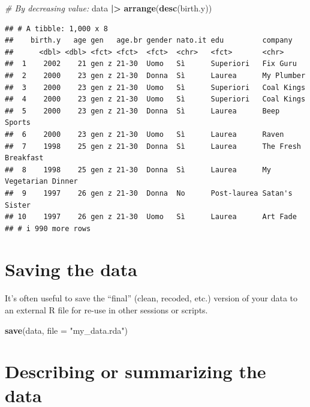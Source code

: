 \documentclass[
]{book}
\newenvironment{Shaded}{\begin{snugshade}}{\end{snugshade}}
\newcommand{\AttributeTok}[1]{\textcolor[rgb]{0.13,0.29,0.53}{#1}}
\newcommand{\CommentTok}[1]{\textcolor[rgb]{0.56,0.35,0.01}{\textit{#1}}}
\newcommand{\FunctionTok}[1]{\textcolor[rgb]{0.13,0.29,0.53}{\textbf{#1}}}
\newcommand{\NormalTok}[1]{#1}
\newcommand{\SpecialCharTok}[1]{\textcolor[rgb]{0.81,0.36,0.00}{\textbf{#1}}}
\newcommand{\StringTok}[1]{\textcolor[rgb]{0.31,0.60,0.02}{#1}}
\begin{document}
\begin{Shaded}
\begin{Highlighting}[]
\CommentTok{\# By decreasing value:}
\NormalTok{data }\SpecialCharTok{|\textgreater{}} 
  \FunctionTok{arrange}\NormalTok{(}\FunctionTok{desc}\NormalTok{(birth.y))}
\end{Highlighting}
\end{Shaded}

\begin{verbatim}
## # A tibble: 1,000 x 8
##    birth.y   age gen   age.br gender nato.it edu         company             
##      <dbl> <dbl> <fct> <fct>  <fct>  <chr>   <fct>       <chr>               
##  1    2002    21 gen z 21-30  Uomo   Sì      Superiori   Fix Guru            
##  2    2000    23 gen z 21-30  Donna  Sì      Laurea      My Plumber          
##  3    2000    23 gen z 21-30  Uomo   Sì      Superiori   Coal Kings          
##  4    2000    23 gen z 21-30  Uomo   Sì      Superiori   Coal Kings          
##  5    2000    23 gen z 21-30  Donna  Sì      Laurea      Beep Sports         
##  6    2000    23 gen z 21-30  Uomo   Sì      Laurea      Raven               
##  7    1998    25 gen z 21-30  Donna  Sì      Laurea      The Fresh Breakfast 
##  8    1998    25 gen z 21-30  Donna  Sì      Laurea      My Vegetarian Dinner
##  9    1997    26 gen z 21-30  Donna  No      Post-laurea Satan's Sister      
## 10    1997    26 gen z 21-30  Uomo   Sì      Laurea      Art Fade            
## # i 990 more rows
\end{verbatim}

\hypertarget{saving-the-data}{%
\section{Saving the data}\label{saving-the-data}}

It's often useful to save the ``final'' (clean, recoded, etc.) version of your data to an external R file for re-use in other sessions or scripts.

\begin{Shaded}
\begin{Highlighting}[]
\FunctionTok{save}\NormalTok{(data, }\AttributeTok{file =} \StringTok{"my\_data.rda"}\NormalTok{)}
\end{Highlighting}
\end{Shaded}

\hypertarget{describing-or-summarizing-the-data}{%
\section{Describing or summarizing the data}\label{describing-or-summarizing-the-data}}
\end{document}
